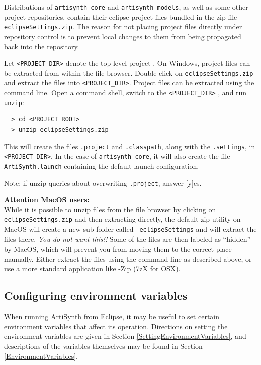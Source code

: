 Distributions of {\tt artisynth\_core} and {\tt artisynth\_models}, as
well as some other project repositories, contain their eclipse project
files bundled in the zip file {\tt eclipseSettings.zip}.  The reason
for not placing project files directly under repository control is to
prevent local changes to them from being propagated back into the
repository.

Let {\tt <PROJECT\_DIR>} denote the top-level project \directory{}.
%
\ifWindows
On Windows, project files can be extracted from within the 
file browser. Double click on {\tt eclipseSettings.zip}
and extract the files into {\tt <PROJECT\_DIR>}.
\else
Project files can be extracted using the command line.
Open a command shell, 
switch to the {\tt <PROJECT\_DIR>} \directory{}, and run {\tt unzip}:
\begin{verbatim}
  > cd <PROJECT_ROOT>
  > unzip eclipseSettings.zip
\end{verbatim}
\fi
This will create the files {\tt .project} and {\tt .classpath}, along
with the \directory{} {\tt .settings}, in {\tt <PROJECT\_DIR>}.  In
the case of {\tt artisynth\_core}, it will also create the file {\tt
ArtiSynth.launch} containing the default launch configuration.

\begin{sideblock}
Note: if unzip queries about overwriting {\tt .project}, answer [y]es.
\end{sideblock}

\ifMacOS
\begin{sideblock}
{\bf Attention MacOS users:}\\[0.5em]
While it is possible to unzip files from the file browser by clicking
on {\tt eclipseSettings.zip} and then extracting directly, the default
zip utility on MacOS will create a new sub-folder called {\tt
eclipseSettings} and will extract the files there.
\emph{You do not want this!!}
Some of the files are then labeled as ``hidden'' by MacOS, which will
prevent you from moving them to the correct place manually. 
Either extract the files using the command line as described
above, or use a more standard application like {-Zip} ({\sf 7zX} for OSX).
\end{sideblock}
\fi

\subsection{Configuring environment variables}
\label{EclipseEnvironmentVariables}

When running ArtiSynth from Eclipse, it may be useful to set certain
environment variables that affect its operation.  Directions on
setting the environment variables are given in
Section \ref{SettingEnvironmentVariables}, and descriptions of the
variables themselves may be found in
Section \ref{EnvironmentVariables}.

